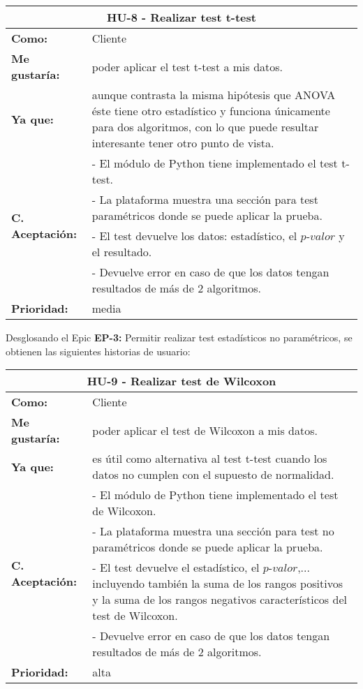 \begin{table}[H]
	\begin{tabular}{| p{3cm}| p{11cm} |}
		\hline
		\multicolumn{2}{|c|}{\textbf{HU-8} - Realizar test t-test} \\ \hline
		\textbf{Como:} & Cliente \\ \hline
		\textbf{Me gustaría:} & poder aplicar el test t-test a mis datos. \\ \hline
		\textbf{Ya que:} & aunque contrasta la misma hipótesis que ANOVA éste tiene otro estadístico y funciona únicamente para dos algoritmos, con lo que puede resultar interesante tener otro punto de vista. \\ \hline
		\multirow{4}{11cm}{\textbf{C. Aceptación:}} & - El módulo de Python tiene implementado el test t-test. \\
		& - La plataforma muestra una sección para test paramétricos donde se puede aplicar la prueba. \\
		& - El test devuelve los datos: estadístico, el $\textit{p-valor}$ y el resultado. \\
		& - Devuelve error en caso de que los datos tengan resultados de más de 2 algoritmos. \\ \hline
		\textbf{\textbf{Prioridad:}} & media \\ \hline
	\end{tabular}
\end{table}


\clearpage
Desglosando el Epic \textbf{EP-3:} Permitir realizar test estadísticos no paramétricos, se obtienen las siguientes historias de usuario:

\begin{table}[H]
	\begin{tabular}{| p{3cm}| p{11cm} |}
		\hline
		\multicolumn{2}{|c|}{\textbf{HU-9} - Realizar test de Wilcoxon} \\ \hline
		\textbf{Como:} & Cliente \\ \hline
		\textbf{Me gustaría:} & poder aplicar el test de Wilcoxon a mis datos. \\ \hline
		\textbf{Ya que:} & es útil como alternativa al test t-test cuando los datos no cumplen con el supuesto de normalidad. \\ \hline
		\multirow{4}{11cm}{\textbf{C. Aceptación:}} & - El módulo de Python tiene implementado el test de Wilcoxon. \\
		& - La plataforma muestra una sección para test no paramétricos donde se puede aplicar la prueba. \\
		& - El test devuelve el estadístico, el $\textit{p-valor}$,... incluyendo también la suma de los rangos positivos y la suma de los rangos negativos característicos del test de Wilcoxon. \\
		& - Devuelve error en caso de que los datos tengan resultados de más de 2 algoritmos. \\ \hline
		\textbf{\textbf{Prioridad:}} & alta \\ \hline
	\end{tabular}
\end{table}

